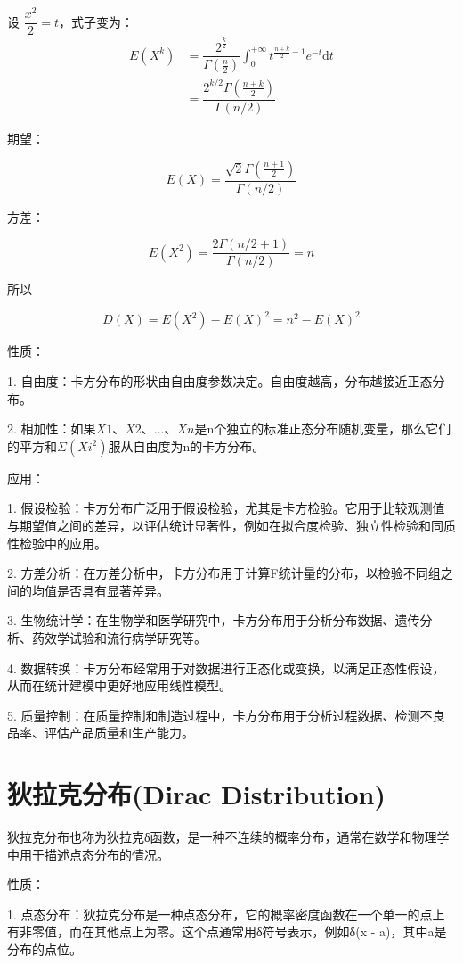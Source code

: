 \documentclass[12pt, a4paper, oneside]{ctexbook}
\begin{document}
设 $\dfrac{x^{2}}{2}= t$，式子变为：
$$
\begin{aligned}
E(X^{k}) &= \dfrac{2^{\frac{k}{2}}}{\Gamma(\frac{n}{2})}\int_0^{+\infty} t^{\frac{n + k}{2} - 1}e^{-t}\mathrm{d}t \\
&= \dfrac{2^{k / 2}\Gamma(\frac{n + k}{2})}{\Gamma(n / 2)}
\end{aligned}
$$

 期望：

$$
E(X) = \dfrac{\sqrt{2}\Gamma(\frac{n + 1}{2})}{\Gamma(n / 2)}
$$

 方差：

$$
E(X^{2}) = \dfrac{2\Gamma(n / 2 + 1)}{\Gamma(n / 2)} = n
$$

所以

$$
D(X) = E(X^{2}) - E(X)^{2} = n^{2} - E(X)^{2}
$$

 性质：

1. 自由度：卡方分布的形状由自由度参数决定。自由度越高，分布越接近正态分布。

2. 相加性：如果$X1、X2、...、Xn$是n个独立的标准正态分布随机变量，那么它们的平方和$Σ(Xi^2)$服从自由度为n的卡方分布。

 应用：

1. 假设检验：卡方分布广泛用于假设检验，尤其是卡方检验。它用于比较观测值与期望值之间的差异，以评估统计显著性，例如在拟合度检验、独立性检验和同质性检验中的应用。

2. 方差分析：在方差分析中，卡方分布用于计算F统计量的分布，以检验不同组之间的均值是否具有显著差异。

3. 生物统计学：在生物学和医学研究中，卡方分布用于分析分布数据、遗传分析、药效学试验和流行病学研究等。

4. 数据转换：卡方分布经常用于对数据进行正态化或变换，以满足正态性假设，从而在统计建模中更好地应用线性模型。

5. 质量控制：在质量控制和制造过程中，卡方分布用于分析过程数据、检测不良品率、评估产品质量和生产能力。

\section{狄拉克分布(Dirac Distribution)}


狄拉克分布也称为狄拉克δ函数，是一种不连续的概率分布，通常在数学和物理学中用于描述点态分布的情况。

 性质：

1. 点态分布：狄拉克分布是一种点态分布，它的概率密度函数在一个单一的点上有非零值，而在其他点上为零。这个点通常用δ符号表示，例如δ(x - a)，其中a是分布的点位。
\end{document}
